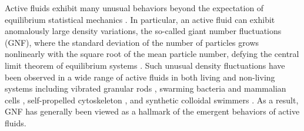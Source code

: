 \documentclass[twocolumn,aps,prl,amsmath,amssymb,longbibliography]{revtex4-2}
\begin{document}
Active fluids exhibit many unusual behaviors beyond the expectation of equilibrium statistical mechanics \cite{Ramaswamy2010,Cates2012,Marchetti2013,Poon2013,Elgeti2015}.
In particular, an active fluid can exhibit anomalously large density variations, the so-called giant number fluctuations (GNF), where the standard deviation of the number of particles grows nonlinearly with the square root of the mean particle number, defying the central limit theorem of equilibrium systems \cite{Mishin2015}.
Such unusual density fluctuations have been observed in a wide range of active fluids in both living and non-living systems including vibrated granular rods \cite{Narayan2007,Aranson2008,Kudrolli2008,Deseigne2010},
swarming bacteria \cite{Zhang2010,Nishiguchi2017} and mammalian cells \cite{Kawaguchi2017},
self-propelled cytoskeleton \cite{Schaller2013}, and synthetic colloidal swimmers \cite{Palacci2013,Karani2019}. As a result, GNF has generally been viewed as a hallmark of the emergent behaviors of active fluids.
\end{document}
